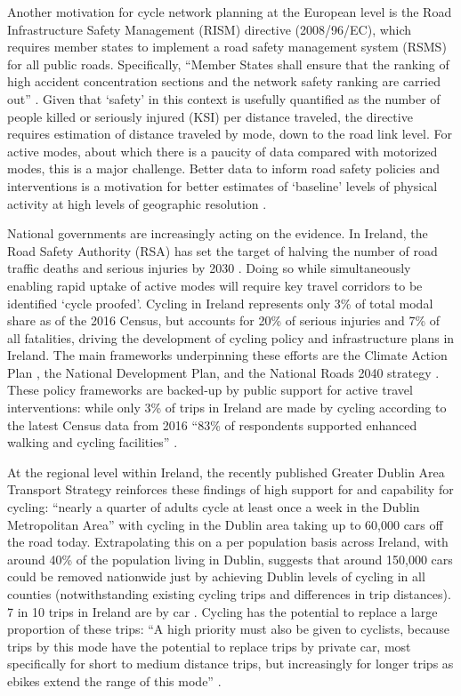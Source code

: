 \documentclass[
  super,
  preprint,
  3p]{elsarticle}
\begin{document}
Another motivation for cycle network planning at the European level is
the Road Infrastructure Safety Management (RISM) directive (2008/96/EC),
which requires member states to implement a road safety management
system (RSMS) for all public roads. Specifically, ``Member States shall
ensure that the ranking of high accident concentration sections and the
network safety ranking are carried out'' \citep{directiv2008}. Given
that `safety' in this context is usefully quantified as the number of
people killed or seriously injured (KSI) per distance traveled, the
directive requires estimation of distance traveled by mode, down to the
road link level. For active modes, about which there is a paucity of
data compared with motorized modes, this is a major challenge. Better
data to inform road safety policies and interventions is a motivation
for better estimates of `baseline' levels of physical activity at high
levels of geographic resolution \citep{tait2023}.

National governments are increasingly acting on the evidence. In
Ireland, the Road Safety Authority (RSA) has set the target of halving
the number of road traffic deaths and serious injuries by 2030
\citep{national2021}. Doing so while simultaneously enabling rapid
uptake of active modes will require key travel corridors to be
identified `cycle proofed'. Cycling in Ireland represents only 3\% of
total modal share as of the 2016 Census, but accounts for 20\% of
serious injuries and 7\% of all fatalities, driving the development of
cycling policy and infrastructure plans in Ireland. The main frameworks
underpinning these efforts are the Climate Action Plan
\citep{climate2022a}, the National Development Plan, and the National
Roads 2040 strategy \citep{national2023}. These policy frameworks are
backed-up by public support for active travel interventions: while only
3\% of trips in Ireland are made by cycling according to the latest
Census data from 2016 ``83\% of respondents supported enhanced walking
and cycling facilities'' \citep{sustaina2019}.

At the regional level within Ireland, the recently published Greater
Dublin Area Transport Strategy \citep{greater} reinforces these findings
of high support for and capability for cycling: ``nearly a quarter of
adults cycle at least once a week in the Dublin Metropolitan Area'' with
cycling in the Dublin area taking up to 60,000 cars off the road today.
Extrapolating this on a per population basis across Ireland, with around
40\% of the population living in Dublin, suggests that around 150,000
cars could be removed nationwide just by achieving Dublin levels of
cycling in all counties (notwithstanding existing cycling trips and
differences in trip distances). 7 in 10 trips in Ireland are by car
\citep{national} . Cycling has the potential to replace a large
proportion of these trips: ``A high priority must also be given to
cyclists, because trips by this mode have the potential to replace trips
by private car, most specifically for short to medium distance trips,
but increasingly for longer trips as ebikes extend the range of this
mode'' \citep{greater}.
\end{document}
